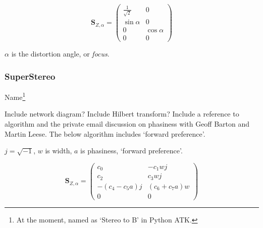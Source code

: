 \documentclass[12pt]{article}
\begin{document}
\begin{equation}	\label{eq:simple_stereo}
\mathbf{S}_{Z, \alpha} = \begin{pmatrix}
	\frac{1}{\sqrt{2}} & 0 \\
	\sin{\alpha} & 0\\
	0 & \cos{\alpha}\\
	0 & 0
\end{pmatrix}
\end{equation}


\(\alpha\) is the distortion angle, or {\em focus}.


\subsubsection{SuperStereo}

Name\footnote{At the moment, named as `Stereo to B' in Python ATK.} 

Include network diagram? Include Hilbert transform? Include a reference to algorithm and the private email discussion on phasiness with Geoff Barton and Martin Leese. The below algorithm includes `forward preference'.

\(j = \sqrt{-1}\), \(w\) is width, \(a\) is phasiness, `forward preference'.


\begin{equation}	\label{eq:super_stereo}
\mathbf{S}_{Z, \alpha} = \begin{pmatrix}
	c_{0} & -c_{1}wj \\
	c_{2} &  c_{3}wj\\
	- (c_{4} -  c_{5}a)j & (c_{6} + c_{7}a)w\\
	0 & 0
\end{pmatrix}
\end{equation}
\end{document}

